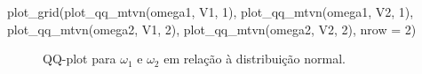 \documentclass[
  a4paperpaper,
]{article}
\newenvironment{Shaded}{\begin{snugshade}}{\end{snugshade}}
\newcommand{\AttributeTok}[1]{\textcolor[rgb]{0.40,0.45,0.13}{#1}}
\newcommand{\DecValTok}[1]{\textcolor[rgb]{0.68,0.00,0.00}{#1}}
\newcommand{\FunctionTok}[1]{\textcolor[rgb]{0.28,0.35,0.67}{#1}}
\newcommand{\NormalTok}[1]{\textcolor[rgb]{0.00,0.23,0.31}{#1}}
\newcommand{\SpecialCharTok}[1]{\textcolor[rgb]{0.37,0.37,0.37}{#1}}
\newcommand{\StringTok}[1]{\textcolor[rgb]{0.13,0.47,0.30}{#1}}
\begin{document}
\begin{Shaded}
\begin{Highlighting}[]
\FunctionTok{plot\_grid}\NormalTok{(}\FunctionTok{plot\_qq\_mtvn}\NormalTok{(omega1, V1, }\DecValTok{1}\NormalTok{),}
          \FunctionTok{plot\_qq\_mtvn}\NormalTok{(omega1, V2, }\DecValTok{1}\NormalTok{),}
          \FunctionTok{plot\_qq\_mtvn}\NormalTok{(omega2, V1, }\DecValTok{2}\NormalTok{),}
          \FunctionTok{plot\_qq\_mtvn}\NormalTok{(omega2, V2, }\DecValTok{2}\NormalTok{), }\AttributeTok{nrow =} \DecValTok{2}\NormalTok{)}
\end{Highlighting}
\end{Shaded}

\begin{figure}[H]


\caption{\label{fig-qqplots}QQ-plot para \(\omega_1\) e \(\omega_2\) em
relação à distribuição normal.}

\end{figure}%

\begin{Shaded}
\end{Shaded}
\end{document}
